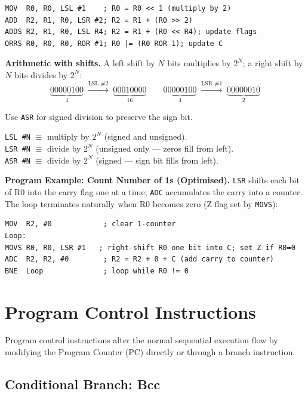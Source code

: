 \documentclass[11pt, a4paper, notitlepage]{report}
\theoremstyle{definition}
\theoremstyle{remark}
\theoremstyle{definition}
\begin{document}
\begin{lstlisting}
MOV  R0, R0, LSL #1    ; R0 = R0 << 1 (multiply by 2)
ADD  R2, R1, R0, LSR #2; R2 = R1 + (R0 >> 2)
ADDS R2, R1, R0, LSL R4; R2 = R1 + (R0 << R4); update flags
ORRS R0, R0, R0, ROR #1; R0 |= (R0 ROR 1); update C
\end{lstlisting}

\textbf{Arithmetic with shifts.} A left shift by $N$ bits multiplies by $2^N$; a right shift by $N$ bits divides by $2^N$:
\[
  \underbrace{00000100}_{4}\;\xrightarrow{\text{LSL \#2}}\;\underbrace{00010000}_{16}
  \qquad
  \underbrace{00000100}_{4}\;\xrightarrow{\text{LSR \#1}}\;\underbrace{00000010}_{2}
\]

Use \texttt{ASR} for signed division to preserve the sign bit.

\begin{keyresult}[title={Shift as Fast Multiplication/Division}]
\texttt{LSL \#N} $\equiv$ multiply by $2^N$ (signed and unsigned).\\
\texttt{LSR \#N} $\equiv$ divide by $2^N$ (unsigned only --- zeros fill from left).\\
\texttt{ASR \#N} $\equiv$ divide by $2^N$ (signed --- sign bit fills from left).
\end{keyresult}

\textbf{Program Example: Count Number of 1s (Optimised).} \texttt{LSR} shifts each bit of R0 into the carry flag one at a time; \texttt{ADC} accumulates the carry into a counter. The loop terminates naturally when R0 becomes zero (Z flag set by \texttt{MOVS}):

\begin{lstlisting}
MOV  R2, #0            ; clear 1-counter
Loop:
MOVS R0, R0, LSR #1   ; right-shift R0 one bit into C; set Z if R0=0
ADC  R2, R2, #0        ; R2 = R2 + 0 + C (add carry to counter)
BNE  Loop              ; loop while R0 != 0
\end{lstlisting}

\section{Program Control Instructions}

Program control instructions alter the normal sequential execution flow by modifying the Program Counter (PC) directly or through a branch instruction.

\subsection{Conditional Branch: Bcc}
\end{document}
